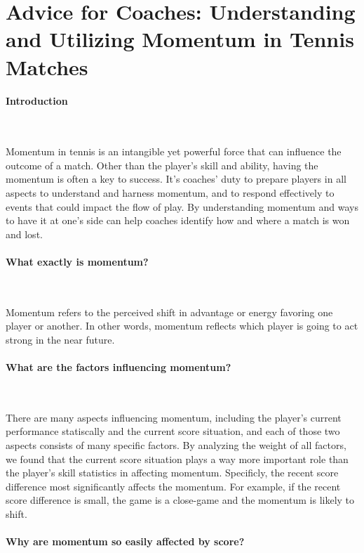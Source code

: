 \section{Advice for Coaches: Understanding and Utilizing Momentum in Tennis Matches}

\paragraph{Introduction}~{}

Momentum in tennis is an intangible yet powerful force that can influence the outcome of a match. Other than the player's skill and ability, having the momentum is often a key to success. It's coaches' duty to prepare players in all aspects to understand and harness momentum, and to respond effectively to events that could impact the flow of play. By understanding momentum and ways to have it at one's side can help coaches identify how and where a match is won and lost.

\paragraph{What exactly is momentum?}~{}

Momentum refers to the perceived shift in advantage or energy favoring one player or another. In other words, momentum reflects which player is going to act strong in the near future.

\paragraph{What are the factors influencing momentum?}~{}

There are many aspects influencing momentum, including the player's current performance statiscally and the current score situation, and each of those two aspects consists of many specific factors. By analyzing the weight of all factors, we found that the current score situation plays a way more important role than the player's skill statistics in affecting momentum. Specificly, the recent score difference most significantly affects the momentum. For example, if the recent score difference is small, the game is a close-game and the momentum is likely to shift.

\paragraph{Why are momentum so easily affected by score?}~{}

